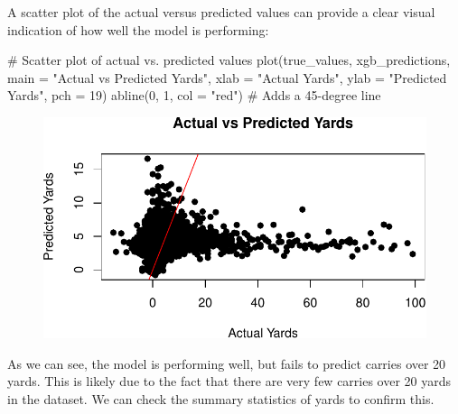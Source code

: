 \documentclass[
  super,
  preprint,
  3p]{elsarticle}
\newenvironment{Shaded}{\begin{snugshade}}{\end{snugshade}}
\newcommand{\AttributeTok}[1]{\textcolor[rgb]{0.40,0.45,0.13}{#1}}
\newcommand{\CommentTok}[1]{\textcolor[rgb]{0.37,0.37,0.37}{#1}}
\newcommand{\DecValTok}[1]{\textcolor[rgb]{0.68,0.00,0.00}{#1}}
\newcommand{\FunctionTok}[1]{\textcolor[rgb]{0.28,0.35,0.67}{#1}}
\newcommand{\NormalTok}[1]{\textcolor[rgb]{0.00,0.23,0.31}{#1}}
\newcommand{\SpecialCharTok}[1]{\textcolor[rgb]{0.37,0.37,0.37}{#1}}
\newcommand{\StringTok}[1]{\textcolor[rgb]{0.13,0.47,0.30}{#1}}
\begin{document}
A scatter plot of the actual versus predicted values can provide a clear
visual indication of how well the model is performing:

\begin{Shaded}
\begin{Highlighting}[]
\CommentTok{\# Scatter plot of actual vs. predicted values}
\FunctionTok{plot}\NormalTok{(true\_values, xgb\_predictions, }\AttributeTok{main =} \StringTok{"Actual vs Predicted Yards"}\NormalTok{, }\AttributeTok{xlab =} \StringTok{"Actual Yards"}\NormalTok{, }\AttributeTok{ylab =} \StringTok{"Predicted Yards"}\NormalTok{, }\AttributeTok{pch =} \DecValTok{19}\NormalTok{)}
\FunctionTok{abline}\NormalTok{(}\DecValTok{0}\NormalTok{, }\DecValTok{1}\NormalTok{, }\AttributeTok{col =} \StringTok{"red"}\NormalTok{)  }\CommentTok{\# Adds a 45{-}degree line}
\end{Highlighting}
\end{Shaded}

\begin{figure}[H]

{\centering \includegraphics{project_report_files/figure-pdf/unnamed-chunk-10-1.pdf}

}

\end{figure}

As we can see, the model is performing well, but fails to predict
carries over 20 yards. This is likely due to the fact that there are
very few carries over 20 yards in the dataset. We can check the summary
statistics of yards to confirm this.

\begin{Shaded}
\end{Shaded}
\end{document}
